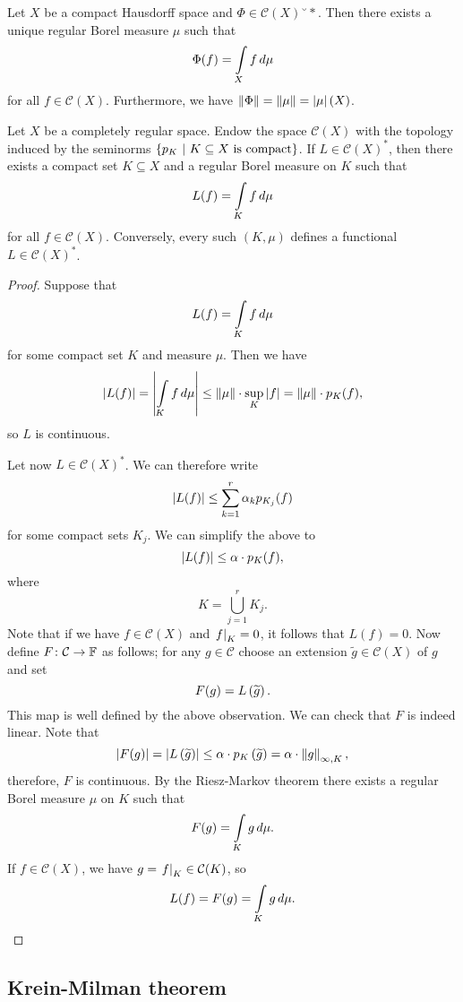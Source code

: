 \begin{izrek}
Let $X$ be a compact Hausdorff space and
$\Phi \in \mathcal{C}(X)˘*$. Then there exists a unique regular
Borel measure $\mu$ such that
\[
\Phi(f) = \int\limits_X f\,d\mu
\]
for all $f \in \mathcal{C}(X)$. Furthermore, we have
$\left\lVert \Phi\right\rVert = \left\lVert \mu\right\rVert = \left\lvert \mu\right\rvert(X)$.
\end{izrek}

\begin{trditev}
Let $X$ be a completely regular space. Endow the space
$\mathcal{C}(X)$ with the topology induced by the seminorms
$\left\{p_K~\middle\vert~\text{$K \subseteq X$ is compact}\right\}$. If
$L \in \mathcal{C}(X)^*$, then there exists a compact set
$K \subseteq X$ and a regular Borel measure on $K$ such that
\[
L(f) = \int\limits_K f\,d\mu
\]
for all $f \in \mathcal{C}(X)$. Conversely, every such $(K, \mu)$
defines a functional $L \in \mathcal{C}(X)^*$.
\end{trditev}

\begin{proof}
Suppose that
\[
L(f) = \int\limits_K f\,d\mu
\]
for some compact set $K$ and measure $\mu$. Then we have
\[
\left\lvert L(f)\right\rvert =
\left\lvert \int\limits_K f\,d\mu\right\rvert \leq
\left\lVert \mu\right\rVert \cdot \sup_K \left\lvert f\right\rvert = \left\lVert \mu\right\rVert \cdot p_K(f),
\]
so $L$ is continuous.

Let now $L \in \mathcal{C}(X)^*$. We can therefore write
\[
\left\lvert L(f)\right\rvert \leq \sum_{k=1}^r \alpha_k p_{K_j}(f)
\]
for some compact sets $K_j$. We can simplify the above to
\[
\left\lvert L(f)\right\rvert \leq \alpha \cdot p_K(f),
\]
where
\[
K = \bigcup_{j=1}^r K_j.
\]
Note that if we have $f \in \mathcal{C}(X)$ and
$\left. f\right|_{K}^{} = 0$, it follows that $L(f) = 0$. Now define
$F \colon \mathcal{C} \to \mathbb{F}$ as follows; for any
$g \in \mathcal{C}$ choose an extension
$\widetilde{g} \in \mathcal{C}(X)$ of $g$ and set
\[
F(g) = L \left(\widetilde{g}\right).
\]
This map is well defined by the above observation. We can check
that $F$ is indeed linear. Note that
\[
\left\lvert F(g)\right\rvert =
\left\lvert L \left(\widetilde{g}\right)\right\rvert \leq
\alpha \cdot p_K \left(\widetilde{g}\right) =
\alpha \cdot \left\lVert g\right\rVert_{\infty, K},
\]
therefore, $F$ is continuous. By the Riesz-Markov theorem there
exists a regular Borel measure $\mu$ on $K$ such that
\[
F(g) = \int\limits_K g\,d\mu.
\]
If $f \in \mathcal{C}(X)$, we have
$g = \left. f\right|_{K}^{} \in \mathcal{C}(K)$, so
\[
L(f) = F(g) = \int\limits_K g\,d\mu. \qedhere
\]
\end{proof}

\newpage

\subsection{Krein-Milman theorem}

